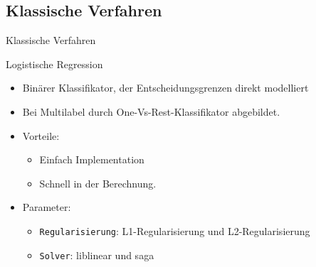 \documentclass[aspectratio=169]{beamer} %
\begin{document}
\subsection{Klassische Verfahren}

\begin{frame}{Klassische Verfahren}
    \begin{block}{Logistische Regression}
        \begin{itemize}
            \item Binärer Klassifikator, der Entscheidungsgrenzen direkt modelliert
            \item Bei Multilabel durch One-Vs-Rest-Klassifikator abgebildet. 
            \item Vorteile:
                \begin{itemize}
                    \item Einfach Implementation
                    \item Schnell in der Berechnung.
                \end{itemize}
            \item Parameter:
                \begin{itemize}
                    \item \texttt{Regularisierung}: L1-Regularisierung und L2-Regularisierung
                    \item \texttt{Solver}: liblinear und saga
                \end{itemize}
        \end{itemize}
    \end{block} 
\end{frame}
\end{document}
